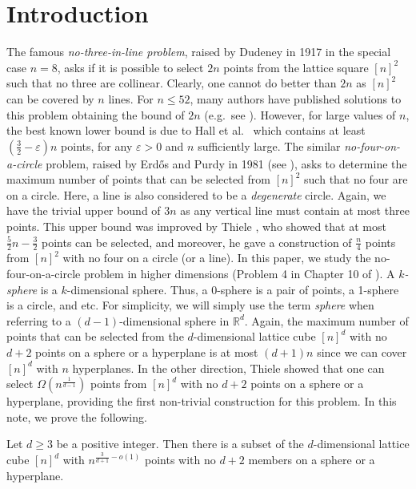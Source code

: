 \section{Introduction}
%
%
The famous \emph{no-three-in-line problem}, raised by Dudeney in 1917 in the special case $n = 8$, asks if it is possible to select $2n$ points from the lattice square $[n]^2$ such that no three are collinear.  Clearly, one cannot do better than $2n$ as $[n]^2$ can be covered by $n$ lines.  For $n\leq 52$, many authors have published solutions to this problem obtaining the bound of $2n$ (e.g.~see \cite{Fl}).  However, for large values of $n$, the best known lower bound is due to Hall et al.~\cite{Ha} which contains at least $\left(\frac{3}{2} - \varepsilon\right)n$ points, for any $\varepsilon > 0$ and $n$ sufficiently large.
%
The similar \emph{no-four-on-a-circle} problem, raised by Erd\H os and Purdy in 1981 (see \cite{RKG}), asks to determine the maximum number of points that can be selected from $[n]^2$ such that no four are on a circle.  Here, a line is also considered to be a \emph{degenerate} circle.  Again, we have the trivial upper bound of $3n$ as any vertical line must contain at most three points.  This upper bound was improved by Thiele \cite{thiele1}, who showed that at most $\frac{5}{2}n - \frac{3}{2}$ points can be selected, and moreover, he gave a construction of $\frac{n}{4}$ points from $[n]^2$ with no four on a circle (or  a line).  
%
%
In this paper, we study the no-four-on-a-circle problem in higher dimensions (Problem 4 in Chapter 10 of \cite{brass}).  A \emph{$k$-sphere} is a $k$-dimensional sphere.  Thus, a 0-sphere is a pair of points, a 1-sphere is a circle, and etc.  For simplicity, we will simply use the term \emph{sphere} when referring to a $(d-1)$-dimensional sphere in $\mathbb{R}^d$.  Again, the maximum number of points that can be selected from the $d$-dimensional lattice cube $[n]^d$ with no $d+2$ points on a sphere or a hyperplane is at most $(d+1)n$ since we can cover $[n]^d$ with $n$ hyperplanes.  In the other direction, Thiele \cite{thiele2} showed that one can select $\Omega(n^{\frac{1}{d-1}})$ points from $[n]^d$ with no $d+2$ points on a sphere or a hyperplane, providing the first non-trivial construction for this problem.  In this note, we prove the following.
%
%
%
%
%
%
%
\begin{theorem}\label{higherD} Let $d \geq 3$ be a positive integer. Then there is a subset of the $d$-dimensional lattice cube $[n]^d$ with $n^{\frac{3}{d+1} -o(1)}$ points with no $d+2$ members on a sphere or a hyperplane.
\end{theorem}
